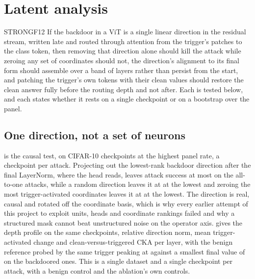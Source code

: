 \documentclass[../main.tex]{subfiles}
\begin{document}
\section{Latent analysis}
\label{sec:latent}

\begin{claim}{STRONG}{F12}
If the backdoor in a ViT is a single linear direction in the residual stream, written late and routed through attention from the trigger's patches to the class token, then removing that direction alone should kill the attack while zeroing any set of coordinates should not, the direction's alignment to its final form should assemble over a band of layers rather than persist from the start, and patching the trigger's own tokens with their clean values should restore the clean answer fully before the routing depth and not after. Each is tested below, and each states whether it rests on a single checkpoint or on a bootstrap over the panel.
\end{claim}

\subsection{One direction, not a set of neurons}

 is the causal test, on \AblationCheckpoints{} CIFAR-10 checkpoints at the highest panel rate, a checkpoint per attack. Projecting out the lowest-rank backdoor direction after the final LayerNorm, where the head reads, leaves attack success at most \AblationDirectionMaxAsr{} on the all-to-one attacks, while a random direction leaves it at \AblationRandomDirectionMinAsr{} at the lowest and zeroing the most trigger-activated coordinates leaves it at \AblationTopCoordinatesMinAsr{} at the lowest. The direction is real, causal and rotated off the coordinate basis, which is why every earlier attempt of this project to exploit units, heads and coordinate rankings failed and why a structured mask cannot beat unstructured noise on the operator axis.  gives the depth profile on the same checkpoints, relative direction norm, mean trigger-activated change and clean-versus-triggered CKA per layer, with the benign reference probed by the same trigger peaking at \DirectionBenignPeakRelNorm{} against a smallest final value of \DirectionBackdooredMinFinalRelNorm{} on the backdoored ones. This is a single dataset and a single checkpoint per attack, with a benign control and the ablation's own controls.
\end{document}
